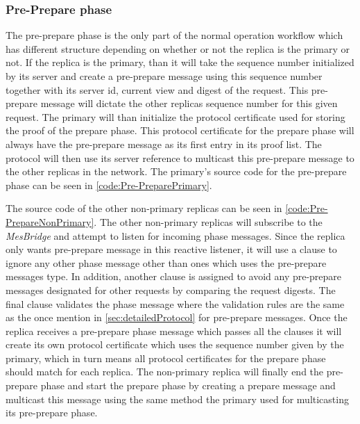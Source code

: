 \subsubsection{Pre-Prepare phase}
The pre-prepare phase is the only part of the normal operation workflow which has different structure depending on whether or not the replica is the primary or not. If the replica is the primary, than it will take the sequence number initialized by its server and create a pre-prepare message using this sequence number together with its server id, current view and digest of the request. This pre-prepare message will dictate the other replicas sequence number for this given request. The primary will than initialize the protocol certificate used for storing the proof of the prepare phase. This protocol certificate for the prepare phase will always have the pre-prepare message as its first entry in its proof list. The protocol will then use its server reference to multicast this pre-prepare message to the other replicas in the network. The primary's source code for the pre-prepare phase can be seen in \autoref{code:Pre-PreparePrimary}.

The source code of the other non-primary replicas can be seen in \autoref{code:Pre-PrepareNonPrimary}. The other non-primary replicas will subscribe to the  \emph{MesBridge} and attempt to listen for incoming phase messages. Since the replica only wants pre-prepare message in this reactive listener, it will use a  clause to ignore any other phase message other than ones which uses the pre-prepare messages type. In addition, another  clause is assigned to avoid any pre-prepare messages designated for other requests by comparing the request digests. The final  clause validates the phase message where the validation  rules are the same as the once mention in \autoref{sec:detailedProtocol} for pre-prepare messages. Once the replica receives a pre-prepare phase message which passes all the  clauses it will create its own protocol certificate which uses the sequence number given by the primary, which in turn means all protocol certificates for the prepare phase should match for each replica. The non-primary replica will finally end the pre-prepare phase and start the prepare phase by creating a prepare message and multicast this message using the same method the primary used for multicasting its pre-prepare phase. 

